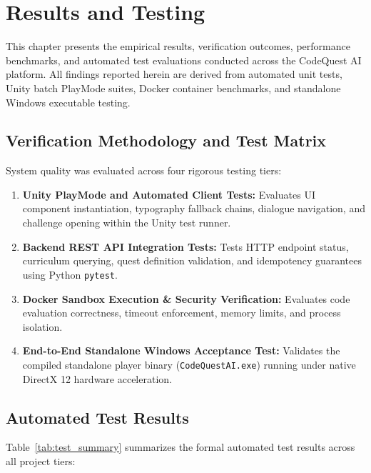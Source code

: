 \chapter{Results and Testing}
\label{ch:results}

This chapter presents the empirical results, verification outcomes, performance benchmarks, and automated test evaluations conducted across the CodeQuest AI platform. All findings reported herein are derived from automated unit tests, Unity batch PlayMode suites, Docker container benchmarks, and standalone Windows executable testing.

\section{Verification Methodology and Test Matrix}
System quality was evaluated across four rigorous testing tiers:
\begin{enumerate}
    \item \textbf{Unity PlayMode and Automated Client Tests:} Evaluates UI component instantiation, typography fallback chains, dialogue navigation, and challenge opening within the Unity test runner.
    \item \textbf{Backend REST API Integration Tests:} Tests HTTP endpoint status, curriculum querying, quest definition validation, and idempotency guarantees using Python \texttt{pytest}.
    \item \textbf{Docker Sandbox Execution \& Security Verification:} Evaluates code evaluation correctness, timeout enforcement, memory limits, and process isolation.
    \item \textbf{End-to-End Standalone Windows Acceptance Test:} Validates the compiled standalone player binary (\texttt{CodeQuestAI.exe}) running under native DirectX 12 hardware acceleration.
\end{enumerate}

\section{Automated Test Results}
Table~\ref{tab:test_summary} summarizes the formal automated test results across all project tiers:

